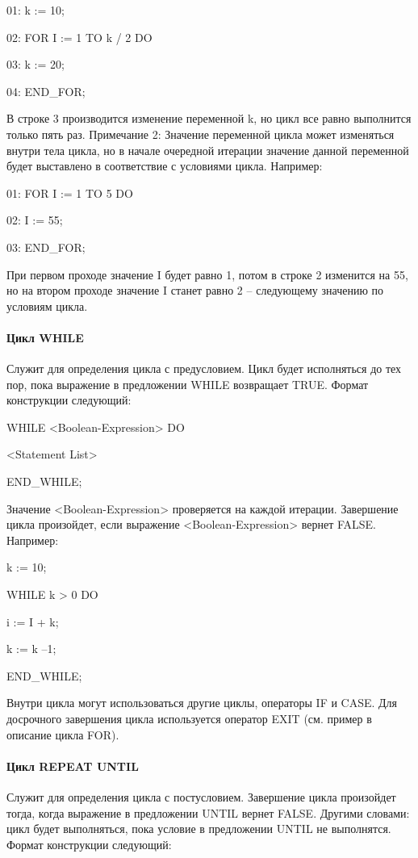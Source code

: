 \documentclass[letterpaper,10pt,russian]{sphinxmanual}
\begin{document}
01: k := 10;

02: FOR I := 1 TO k / 2 DO

03: k := 20;

04: END\_FOR;

В строке 3 производится изменение переменной k, но цикл все равно
выполнится только пять раз. Примечание 2: Значение переменной цикла
может изменяться внутри тела цикла, но в начале очередной итерации
значение данной переменной будет выставлено в соответствие с условиями
цикла. Например:

01: FOR I := 1 TO 5 DO

02: I := 55;

03: END\_FOR;

При первом проходе значение I будет равно 1, потом в строке 2 изменится
на 55, но на втором проходе значение I станет равно 2 – следующему
значению по условиям цикла.


\paragraph{Цикл WHILE}
\label{iec_guide/st_guide:while}
Служит для определения цикла с предусловием. Цикл будет исполняться до
тех пор, пока выражение в предложении WHILE возвращает TRUE. Формат
конструкции следующий:

WHILE \textless{}Boolean-Expression\textgreater{} DO

\textless{}Statement List\textgreater{}

END\_WHILE;

Значение \textless{}Boolean-Expression\textgreater{} проверяется на каждой итерации. Завершение
цикла произойдет, если выражение \textless{}Boolean-Expression\textgreater{} вернет FALSE.
Например:

k := 10;

WHILE k \textgreater{} 0 DO

i := I + k;

k := k –1;

END\_WHILE;

Внутри цикла могут использоваться другие циклы, операторы IF и CASE. Для
досрочного завершения цикла используется оператор EXIT (см. пример в
описание цикла FOR).


\paragraph{Цикл REPEAT UNTIL}
\label{iec_guide/st_guide:repeat-until}
Служит для определения цикла с постусловием. Завершение цикла произойдет
тогда, когда выражение в предложении UNTIL вернет FALSE. Другими
словами: цикл будет выполняться, пока условие в предложении UNTIL не
выполнятся. Формат конструкции следующий:
\end{document}
